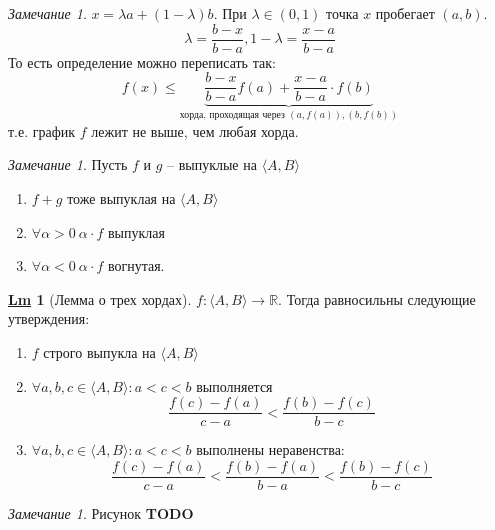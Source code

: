 \documentclass[12pt]{article}
\newenvironment{MyList}[1][4pt]{
  \begin{enumerate}[1.]
  \setlength{\parskip}{0pt}
  \setlength{\itemsep}{#1}
}{       
  \end{enumerate}
}
\def\TODO{{\color{red}\bf TODO}}
\def\R{\mathbb{R}}       %
\theoremstyle{definition} %
\newtheorem{Lm}[Thm]{\underline{Lm}} %
\theoremstyle{plain} %
\theoremstyle{remark} %
\newtheorem{Rem}[Thm]{Замечание} %
\begin{document}
\begin{Rem}
    $x = \lambda a + (1 - \lambda) b$.
    При $\lambda \in (0, 1)$ точка $x$ пробегает $(a, b)$.
    \[\lambda = \frac{b - x}{b - a}, 1 - \lambda = \frac{x - a}{b - a}\]
    То есть определение можно переписать так:
    \[f(x) \leqslant \underbrace{\frac{b - x}{b - a}f(a) + \frac{x - a}{b - a} \cdot f(b)}_{\text{хорда, проходящая через }(a, f(a)), (b, f(b))}\]
    т.е. график $f$ лежит не выше, чем любая хорда.
\end{Rem}

\begin{Rem}
    Пусть $f$ и $g$ -- выпуклые на $\langle A, B\rangle$
    \begin{MyList}
        \item $f + g$ тоже выпуклая на $\langle A, B\rangle$ 
        \item $\forall \alpha > 0 \ \alpha \cdot f$ выпуклая
        \item $\forall \alpha < 0 \ \alpha \cdot f$ вогнутая.
    \end{MyList}
\end{Rem}

\begin{Lm}[Лемма о трех хордах]
    $f : \langle A, B\rangle \to \R$. Тогда равносильны следующие утверждения:

    \begin{MyList}
        \item $f$ строго выпукла на $\langle A, B\rangle$ 
        \item $\forall a, b, c \in \langle A, B\rangle : a < c < b$ выполняется
        \[ \frac{f(c) - f(a)}{c - a} < \frac{f(b) - f(c)}{b - c}\] 

        \item $\forall a, b, c \in \langle A, B\rangle : a < c < b$ выполнены неравенства:
        \[ \frac{f(c) - f(a)}{c - a} < \frac{f(b) - f(a)}{b - a} < \frac{f(b) - f(c)}{b - c}\]
    \end{MyList}
\end{Lm}

\begin{Rem}
    Рисунок \TODO
\end{Rem}
\end{document}
